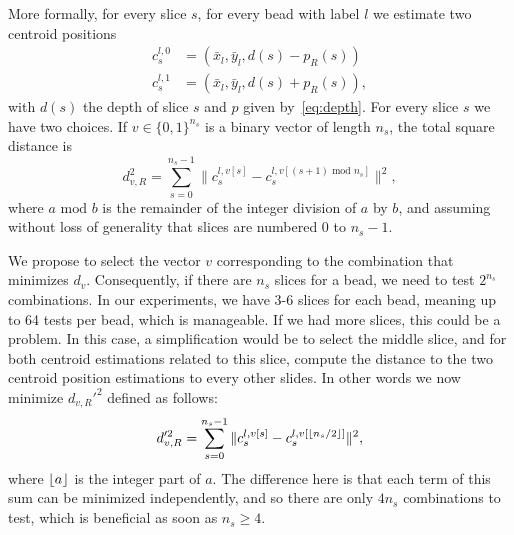 \documentclass{llncs}
\DeclarePairedDelimiter\floor{\lfloor}{\rfloor}
\begin{document}
More formally, for every slice $s$, for every bead with label $l$ we estimate two centroid positions 
\begin{align}
c_s^{l,0} &= (\bar{x}_l, \bar{y}_l, d(s)-p_R(s)) \label{eq:cs0}\\ 
c_s^{l,1} &=  (\bar{x}_l, \bar{y}_l, d(s)+p_R(s))\label{eq:cs1},
\end{align} 
with $d(s)$ the depth of slice $s$ and $p$ given by~\eqref{eq:depth}. For every slice $s$ we have two choices.  If $v \in \{0,1\}^{n_s}$ is a binary vector of length $n_s$, the total square distance is 
\begin{equation}
d_{v,R}^2 = \sum_{s=0}^{n_s-1} \|c_s^{l,v[s]}-c_s^{l,v[(s+1)\text{ mod } n_s]}\|^2,\label{eq:dv}
\end{equation}
where $a \text{ mod } b$ is the remainder of the integer division of $a$ by $b$, and assuming without loss of generality that slices are numbered 0 to $n_s-1$.

We propose to select the vector $v$ corresponding to the combination that minimizes $d_v$. Consequently, if there are $n_s$ slices for a bead,  we need to test $2^{n_s}$ combinations.
In our experiments, we have 3-6 slices for each bead, meaning up to 64 tests per bead, which is manageable. If we had more slices, this could be a problem. In this case, a simplification would be to select the middle slice, and for both centroid estimations related to this slice, compute the distance to the two centroid position estimations to every other slides. In other words we now minimize $d_{v,R}'^2$ defined as follows:
\begin{equation}
d_{v,R}'^2 = \sum_{s=0}^{n_s-1} \|c_s^{l,v[s]}-c_s^{l,v[\floor*{n_s/2}]}\|^2,\label{eq:dprime}
\end{equation}
where $\floor*{a}$ is the integer part of $a$. The difference here is that each term of this sum can be minimized independently, and so there are only $4 n_s$ combinations to test, which is beneficial as soon as $n_s \geq 4$.
\end{document}
